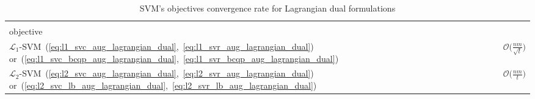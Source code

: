 \begin{table}[H]
\centering
\caption{SVM's objectives convergence rate for Lagrangian dual formulations}
\label{dual_svm_objectives_props}
\begin{tabular}{lr}
\toprule
	& \vtop{\hbox{\strut AdaGrad}\hbox{\strut convergence rate}} \\
objective & 		\\
\midrule
$\mathcal{L}_1$-SVM~(\ref{eq:l1_svc_aug_lagrangian_dual},~\ref{eq:l1_svr_aug_lagrangian_dual}) or~(\ref{eq:l1_svc_bcqp_aug_lagrangian_dual},~\ref{eq:l1_svr_bcqp_aug_lagrangian_dual}) & $\displaystyle \mathcal{O}\Bigg(\frac{nm}{\sqrt{t}}\Bigg)$ \\
$\mathcal{L}_2$-SVM~(\ref{eq:l2_svc_aug_lagrangian_dual},~\ref{eq:l2_svr_aug_lagrangian_dual}) or~(\ref{eq:l2_svc_lb_aug_lagrangian_dual},~\ref{eq:l2_svr_lb_aug_lagrangian_dual}) & $\displaystyle \mathcal{O}\Bigg(\frac{nm}{t}\Bigg)$ \\
\bottomrule
\end{tabular}
\end{table}